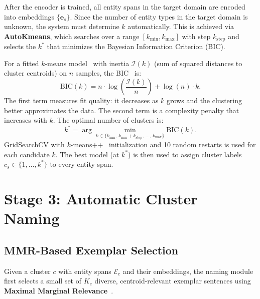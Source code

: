 \documentclass[14pt]{extreport}
\begin{document}
After the encoder is trained, all entity spans in the target domain are encoded into embeddings $\{\mathbf{e}_s\}$. Since the number of entity types in the target domain is unknown, the system must determine $k$ automatically. This is achieved via \textbf{AutoKmeans}, which searches over a range $[k_{\min}, k_{\max}]$ with step $k_{\text{step}}$ and selects the $k^*$ that minimizes the Bayesian Information Criterion (BIC).

For a fitted $k$-means model~\cite{macqueen-1967-kmeans} with inertia $\mathcal{I}(k)$ (sum of squared distances to cluster centroids) on $n$ samples, the BIC~\cite{schwarz-1978-bic} is:
\begin{equation}
    \text{BIC}(k) = n \cdot \log\!\left(\frac{\mathcal{I}(k)}{n}\right) + \log(n) \cdot k.
    \label{eq:bic}
\end{equation}
The first term measures fit quality: it decreases as $k$ grows and the clustering better approximates the data. The second term is a complexity penalty that increases with $k$. The optimal number of clusters is:
\begin{equation}
    k^* = \arg\min_{k \in \{k_{\min},\, k_{\min}+k_{\text{step}},\, \ldots,\, k_{\max}\}} \text{BIC}(k).
    \label{eq:k_star}
\end{equation}
GridSearchCV with $k$-means++~\cite{arthur-vassilvitskii-2007-kmeanspp} initialization and 10 random restarts is used for each candidate $k$. The best model (at $k^*$) is then used to assign cluster labels $c_s \in \{1, \ldots, k^*\}$ to every entity span.


\section{Stage 3: Automatic Cluster Naming}

\subsection{MMR-Based Exemplar Selection}

Given a cluster $c$ with entity spans $\mathcal{E}_c$ and their embeddings, the naming module first selects a small set of $K_e$ diverse, centroid-relevant exemplar sentences using \textbf{Maximal Marginal Relevance}~\cite{carbonell-goldstein-1998-use}.
\end{document}
